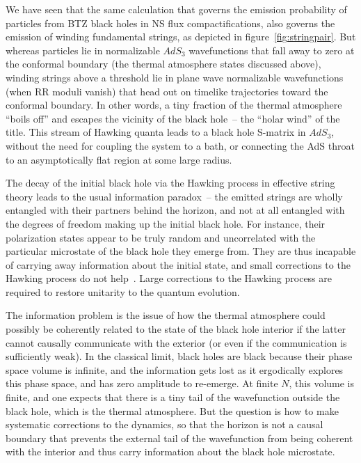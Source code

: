 \documentclass[11pt]{article}
\newcommand{\rcite}{\cite}
\numberwithin{equation}{section}
\begin{document}
We have seen that the same calculation that governs the emission probability of particles from BTZ black holes in NS flux compactifications, also governs the emission of winding fundamental strings, as depicted in figure~\ref{fig:stringpair}.  But whereas particles lie in normalizable $AdS_3$ wavefunctions that fall away to zero at the conformal boundary (the thermal atmosphere states discussed above), winding strings above a threshold lie in plane wave normalizable wavefunctions (when RR moduli vanish) that head out on timelike trajectories toward the conformal boundary.  In other words, a tiny fraction of the thermal atmosphere ``boils off'' and escapes the vicinity of the black hole~-- the ``holar wind'' of the title.  This stream of Hawking quanta leads to a black hole S-matrix in $AdS_3$, without the need for coupling the system to a bath, or connecting the AdS throat to an asymptotically flat region at some large radius.  


The decay of the initial black hole via the Hawking process in effective string theory leads to the usual information paradox~-- the emitted strings are wholly entangled with their partners behind the horizon, and not at all entangled with the degrees of freedom making up the initial black hole.  For instance, their polarization states appear to be truly random and uncorrelated with the particular microstate of the black hole they emerge from.  They are thus incapable of carrying away information about the initial state, and small corrections to the Hawking process do not help~\rcite{Mathur:2009hf,Guo:2021blh}.  Large corrections to the Hawking process are required to restore unitarity to the quantum evolution.


The information problem is the issue of how the thermal atmosphere could possibly be coherently related to the state of the black hole interior if the latter cannot causally communicate with the exterior (or even if the communication is sufficiently weak).  In the classical limit, black holes are black because their phase space volume is infinite, and the information gets lost as it ergodically explores this phase space, and has zero amplitude to re-emerge.  At finite $N$, this volume is finite, and one expects that there is a tiny tail of the wavefunction outside the black hole, which is the thermal atmosphere.  But the question is how to make systematic corrections to the dynamics, so that the horizon is not a causal boundary that prevents the external tail of the wavefunction from being coherent with the interior and thus carry information about the black hole microstate.
\end{document}
